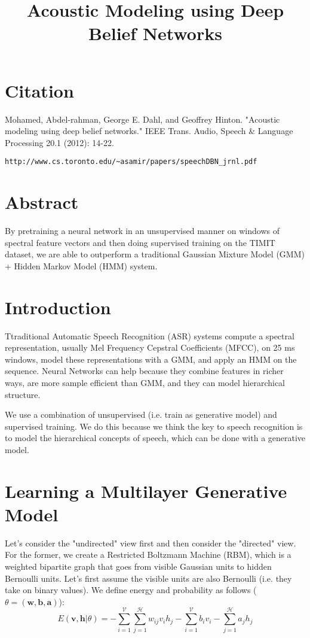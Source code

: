 \documentclass[a4paper]{article}
\title{Acoustic Modeling using Deep Belief Networks}
\date{}
\begin{document}
\maketitle

\section{Citation}
Mohamed, Abdel-rahman, George E. Dahl, and Geoffrey Hinton. "Acoustic modeling using deep belief networks." IEEE Trans. Audio, Speech & Language Processing 20.1 (2012): 14-22.

\begin{verbatim}
http://www.cs.toronto.edu/~asamir/papers/speechDBN_jrnl.pdf
\end{verbatim}

\section{Abstract}
By pretraining a neural network in an unsupervised manner on windows of spectral
feature vectors and then doing supervised training on the TIMIT dataset, we
are able to outperform a traditional Gaussian Mixture Model (GMM) + Hidden
Markov Model (HMM) system.

\section{Introduction}
Ttraditional Automatic Speech Recognition (ASR) systems compute a spectral
representation, usually Mel Frequency Cepstral Coefficients (MFCC), on 25 ms
windows, model these representations with a GMM, and apply an HMM on the
sequence. Neural Networks can help because they combine features
in richer ways, are more sample efficient than GMM, and they can model
hierarchical structure.

We use a combination of unsupervised (i.e. train as generative model) and
supervised training. We do this because we think the key to speech recognition
is to model the hierarchical concepts of speech, which can be done with a
generative model.

\section{Learning a Multilayer Generative Model}
Let's consider the "undirected" view first and then consider the "directed"
view. For the former, we create a Restricted Boltzmann Machine (RBM), which
is a weighted bipartite graph that goes from visible Gaussian units to hidden
Bernoulli units. Let's first assume the visible units are also Bernoulli (i.e.
they take on binary values). We define energy and probability as follows
($\theta = (\mathbf{w}, \mathbf{b}, \mathbf{a})$):
$$
E(\mathbf{v}, \mathbf{h} | \theta) = - \sum_{i=1}^{\mathcal{V}}{
\sum_{j=1}^{\mathcal{H}}{w_{ij} v_i h_j}} - \sum_{i=1}^{\mathcal{V}}{b_i v_i}
- \sum_{j=1}^{\mathcal{H}}{a_j h_j}
$$
\end{document}
